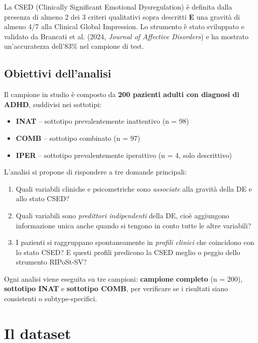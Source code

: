 \documentclass[12pt, a4paper]{article}
\begin{document}
La CSED (Clinically Significant Emotional Dysregulation) è definita dalla presenza di almeno
2 dei 3 criteri qualitativi sopra descritti \textbf{E} una gravità di almeno 4/7 alla Clinical
Global Impression. Lo strumento è stato sviluppato e validato da Brancati et al. (2024,
\textit{Journal of Affective Disorders}) e ha mostrato un'accuratezza dell'83\% nel campione
di test.

\subsection{Obiettivi dell'analisi}

Il campione in studio è composto da \textbf{200 pazienti adulti con diagnosi di ADHD},
suddivisi nei sottotipi:

\begin{itemize}
    \item \textbf{INAT} -- sottotipo prevalentemente inattentivo (n = 98)
    \item \textbf{COMB} -- sottotipo combinato (n = 97)
    \item \textbf{IPER} -- sottotipo prevalentemente iperattivo (n = 4, solo descrittivo)
\end{itemize}

L'analisi si propone di rispondere a tre domande principali:

\begin{enumerate}
    \item Quali variabili cliniche e psicometriche sono \textit{associate} alla gravità della DE
          e allo stato CSED?
    \item Quali variabili sono \textit{predittori indipendenti} della DE, cioè aggiungono
          informazione unica anche quando si tengono in conto tutte le altre variabili?
    \item I pazienti si raggruppano spontaneamente in \textit{profili clinici} che coincidono
          con lo stato CSED? E questi profili predicono la CSED meglio o peggio dello strumento
          RIPoSt-SV?
\end{enumerate}

Ogni analisi viene eseguita su tre campioni: \textbf{campione completo} (n = 200),
\textbf{sottotipo INAT} e \textbf{sottotipo COMB}, per verificare se i risultati siano
consistenti o subtype-specifici.

\section{Il dataset}
\end{document}
